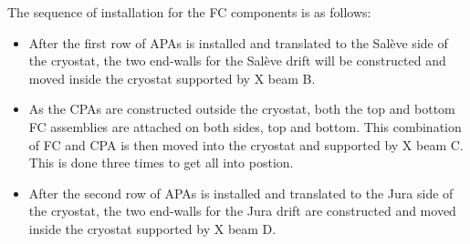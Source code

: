 The sequence of installation for the FC components is as follows:
\begin{itemize}
\item After the first row of APAs is installed and translated to the Sal\`{e}ve side of the cryostat, the two end-walls for the Sal\`{e}ve drift will be constructed and moved inside the cryostat supported 
by X beam B.  
\item As the CPAs %
are constructed outside the cryostat, both the top and bottom FC assemblies are attached on both sides, top and bottom.  This combination of FC and CPA is then moved into the cryostat and supported by X beam C.   
This is done three times to get all into postion.
\item After the second row of APAs is installed and translated to the Jura side of the cryostat, the two end-walls for the Jura drift are constructed and moved inside the cryostat supported by X beam D.   
\end{itemize}



